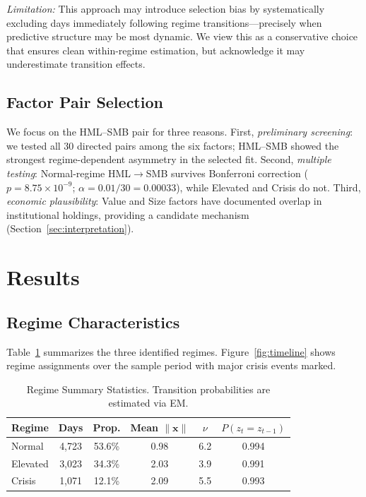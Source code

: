 \documentclass[sigconf]{acmart}
\begin{document}
\emph{Limitation:} This approach may introduce selection bias by systematically
excluding days immediately following regime transitions---precisely when predictive
structure may be most dynamic. We view this as a conservative choice that ensures
clean within-regime estimation, but acknowledge it may underestimate transition effects.

\subsection{Factor Pair Selection}

We focus on the HML--SMB pair for three reasons. First, \emph{preliminary screening}:
we tested all 30 directed pairs among the six factors; HML--SMB showed the strongest
regime-dependent asymmetry in the selected fit. Second, \emph{multiple testing}:
Normal-regime HML$\to$SMB survives Bonferroni correction
($p = 8.75 \times 10^{-9}$; $\alpha = 0.01/30 = 0.00033$), while Elevated and
Crisis do not. Third, \emph{economic plausibility}:
Value and Size factors have documented overlap in institutional holdings, providing
a candidate mechanism (Section~\ref{sec:interpretation}).

\section{Results}

\subsection{Regime Characteristics}

Table~\ref{tab:regimes} summarizes the three identified regimes. Figure~\ref{fig:timeline}
shows regime assignments over the sample period with major crisis events marked.

\begin{table}[t]
\centering
\caption{Regime Summary Statistics. Transition probabilities are estimated via EM.}
\label{tab:regimes}
\small
\begin{tabular}{lccccc}
\toprule
Regime & Days & Prop. & Mean $\|\mathbf{x}\|$ & $\nu$ & $P(z_t{=}z_{t-1})$ \\
\midrule
Normal & 4,723 & 53.6\% & 0.98 & 6.2 & 0.994 \\
Elevated & 3,023 & 34.3\% & 2.03 & 3.9 & 0.991 \\
Crisis & 1,071 & 12.1\% & 2.09 & 5.5 & 0.993 \\
\bottomrule
\end{tabular}
\end{table}
\end{document}
